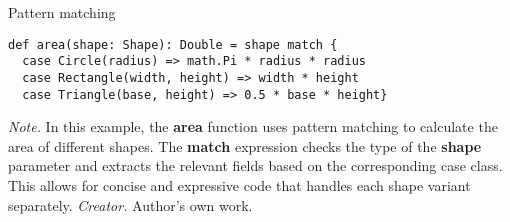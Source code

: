 \begin{table}[h!]
\caption{Pattern matching}
\begin{lstlisting}
def area(shape: Shape): Double = shape match {
  case Circle(radius) => math.Pi * radius * radius
  case Rectangle(width, height) => width * height
  case Triangle(base, height) => 0.5 * base * height}
\end{lstlisting}
\small
\textit{Note.} In this example, the \textbf{area} function uses pattern matching to calculate the area of different shapes. The \textbf{match} expression checks the type of the \textbf{shape} parameter and extracts the relevant fields based on the corresponding case class. This allows for concise and expressive code that handles each shape variant separately.
\textit{Creator.} Author's own work.
\end{table}